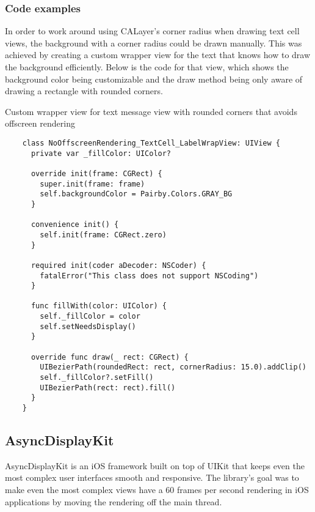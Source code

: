 \documentclass[a4paper,12pt]{article}
\begin{document}
\subsubsection*{Code examples}
In order to work around using CALayer's corner radius when drawing text cell views, the background with a corner radius could be drawn manually. This was achieved by creating a custom wrapper view for the text that knows how to draw the background efficiently. Below is the code for that view, which shows the background color being customizable and the draw method being only aware of drawing a rectangle with rounded corners.
\begin{listing}[H]
  \caption{Custom wrapper view for text message view with rounded corners that avoids offscreen rendering}
  \begin{verbatim}
    class NoOffscreenRendering_TextCell_LabelWrapView: UIView {
      private var _fillColor: UIColor?

      override init(frame: CGRect) {
        super.init(frame: frame)
        self.backgroundColor = Pairby.Colors.GRAY_BG
      }

      convenience init() {
        self.init(frame: CGRect.zero)
      }

      required init(coder aDecoder: NSCoder) {
        fatalError("This class does not support NSCoding")
      }

      func fillWith(color: UIColor) {
        self._fillColor = color
        self.setNeedsDisplay()
      }

      override func draw(_ rect: CGRect) {
        UIBezierPath(roundedRect: rect, cornerRadius: 15.0).addClip()
        self._fillColor?.setFill()
        UIBezierPath(rect: rect).fill()
      }
    }
  \end{verbatim}
\end{listing}


\subsection{AsyncDisplayKit}
AsyncDisplayKit is an iOS framework built on top of UIKit that keeps even the most complex user interfaces smooth and responsive.\cite{IntroducingAsyncDisplayKit} The library's goal was to make even the most complex views have a 60 frames per second rendering in iOS applications by moving the rendering off the main thread.
\end{document}
